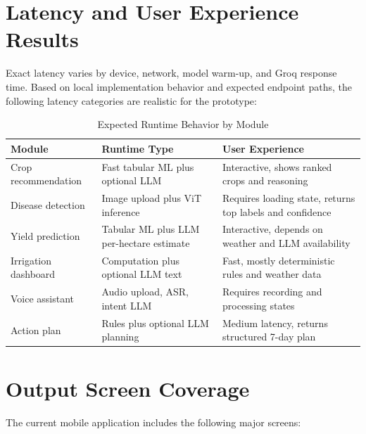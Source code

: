 \documentclass[12pt,a4paper]{report}
\begin{document}
\section{Latency and User Experience Results}

Exact latency varies by device, network, model warm-up, and Groq response time. Based on local implementation behavior and expected endpoint paths, the following latency categories are realistic for the prototype:

\begin{table}[H]
\centering
\caption{Expected Runtime Behavior by Module}
\label{tab:latency}
\small
\begin{tabular}{p{3.5cm}p{4cm}p{5.6cm}}
\toprule
\textbf{Module} & \textbf{Runtime Type} & \textbf{User Experience} \\
\midrule
Crop recommendation & Fast tabular ML plus optional LLM & Interactive, shows ranked crops and reasoning \\
Disease detection & Image upload plus ViT inference & Requires loading state, returns top labels and confidence \\
Yield prediction & Tabular ML plus LLM per-hectare estimate & Interactive, depends on weather and LLM availability \\
Irrigation dashboard & Computation plus optional LLM text & Fast, mostly deterministic rules and weather data \\
Voice assistant & Audio upload, ASR, intent LLM & Requires recording and processing states \\
Action plan & Rules plus optional LLM planning & Medium latency, returns structured 7-day plan \\
\bottomrule
\end{tabular}
\end{table}

\section{Output Screen Coverage}

The current mobile application includes the following major screens:
\end{document}
